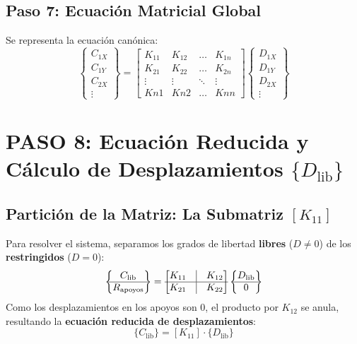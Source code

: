 \documentclass[10pt,a4paper]{article}
\begin{document}
\subsection{Paso 7: Ecuación Matricial Global}
Se representa la ecuación canónica:
\[
\begin{Bmatrix} C_{1X} \\ C_{1Y} \\ C_{2X} \\ \vdots \end{Bmatrix}
=
\begin{bmatrix}
K_{11} & K_{12} & \dots & K_{1n} \\
K_{21} & K_{22} & \dots & K_{2n} \\
\vdots & \vdots & \ddots & \vdots \\
Kn1 & Kn2 & \dots & Knn
\end{bmatrix}
\begin{Bmatrix} D_{1X} \\ D_{1Y} \\ D_{2X} \\ \vdots \end{Bmatrix}
\]

\newpage

\section{PASO 8: Ecuación Reducida y Cálculo de Desplazamientos \texorpdfstring{$\{D_{\text{lib}}\}$}{Dlib}}

\subsection{Partición de la Matriz: La Submatriz $[K_{11}]$}
Para resolver el sistema, separamos los grados de libertad \textbf{libres} ($D \neq 0$) de los \textbf{restringidos} ($D = 0$):
\[
\begin{Bmatrix} C_{\text{lib}} \\ \hline R_{\text{apoyos}} \end{Bmatrix}
=
\begin{bmatrix}
K_{11} & \vline & K_{12} \\
\hline
K_{21} & \vline & K_{22}
\end{bmatrix}
\begin{Bmatrix} D_{\text{lib}} \\ \hline 0 \end{Bmatrix}
\]
Como los desplazamientos en los apoyos son $0$, el producto por $K_{12}$ se anula, resultando la \textbf{ecuación reducida de desplazamientos}:
\[
\{C_{\text{lib}}\} = [K_{11}] \cdot \{D_{\text{lib}}\}
\]
\end{document}
